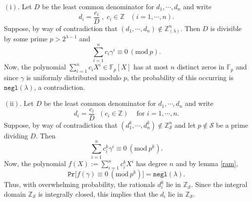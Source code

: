\documentclass[11pt, lettersize, notitlepage, leqno, footskip=0.6cm]{article}
\newcommand{\bz}{\mathbb Z}
\newcommand{\bq}{\mathbb Q}
\newcommand{\bFp}{\mathbb{F}_p}
\newcommand{\slim}{\sum\limits}
\newcommand{\ttt}{\texttt}
\newcommand{\negl}{\ttt{{negl}}}
\newcommand{\mc}{\mathcal}
\newcommand{\mbf}{\mathbf}
\newcommand{\mr}{\mathrm}
\newcommand{\lam}{\lambda}
\newcommand{\lamb}{\lambda}
\newcommand{\bzlam}{\bz_{(\lam)}}
\newcommand{\vs}{\vspace{-0.15cm}}
\newcommand{\noin}{\noindent}
\newcommand{\op}{overwhelming probability}
\newcommand{\Mod}[1]{\ (\mathrm{mod}\ #1)}
\numberwithin{equation}{section}
\begin{document}
\begin{prf} $\mr{(i)}$. Let $D$ be the least common denominator for $d_1,\cdots, d_n$ and write \vs $$d_i = \frac{c_i}{D}\;,\; c_i\in\bz\; \;\;(i=1,\cdots, n).$$ Suppose, by way of contradiction that $(d_1,\cdots, d_n )\notin \bzlam^n$. Then $D$ is divisible by some prime $p>2^{\lam-1}$ and \vs $$\sum\limits_{i=1}^n  {c_i\gamma^i} \equiv 0\Mod{p}.$$ Now, the polynomial $\sum\limits_{i=1}^n c_iX^i \in \bFp[X]$ has at most $n$ distinct zeros in $\bFp$ and since $\gamma$ is uniformly distributed modulo $p$, the probability of this occurring is $\negl(\lamb)$, a contradiction.\vspace{0.15cm} 

\noin $\mr{(ii)}$. Let $D$ be the least common denominator for $d_1,\cdots, d_n$ and write \vs $$d_i = \frac{c_i}{D}\;\; (c_i\in \bz)\;\;\; \text{ for } i=1,\cdots, n.$$ Suppose, by way of contradiction that $(d_1^{k},\cdots, d_n^{k} )\notin \bz_{\mc{S}}^n$ and let $p\notin \mc{S}$ be a prime dividing $D$. Then \vs $$\slim_{i=1}^n c_i^{k}\gamma^i \equiv 0\Mod{p^{k}}.$$ Now, the polynomial $f(X):= \slim_{i=1}^n c_i^{k} X^i$ has degree $n$ and by lemma \ref{ram}, \vs $$\ttt{Pr}\big[f(\gamma)\equiv 0\Mod{p^{k}} \big] = \negl(\lam).$$ Thus, with \op, the rationals $d_i^{k}$ lie in $\bz_{\mc{S}}$. Since the integral domain $\bz_{\mc{S}}$ is integrally closed, this implies that the $d_i$ lie in $\bz_{\mc{S}}$.\end{prf}

\begin{comment} 


\noin $\mbf{2}$. For rationals $d_1,\cdots, d_n\in \bq$ and a randomly generated $\lam$-bit integer $\gamma$, if \vs $$\slim_{i=1}^n d_i^{n\lam}\gamma^i\; \in \;\bz,$$ with \op, $(d_1,\cdots, d_n)\in \bz^n$.



\noin $\mbf{2}$. Let $D$ be the least common denominator for $d_1,\cdots, d_n$ and write $d_i = \frac{c_i}{D}$ for $i=1,\cdots, n.$ Suppose, by way of contradiction that $(d_1^{n\lam},\cdots, d_n^{n\lam} )\notin \bz^n$ and let $p$ be a prime dividing $D$. Then $$\slim_{i=1}^n c_i^{n\lam}\gamma^i \equiv 0\Mod{p^{n\lam}}.$$ Now, the polynomial $f(X):= \slim_{i=1}^n c_i^{n\lam} X^i$ has degree $n$ and by the preceding lemma, \vs $$\ttt{Pr}\big[h(\gamma)\equiv 0\Mod{p^{n\lam}} \big] = \negl(\lam).$$ Thus, with \op, the rationals $d_i^{n\lam}$ are integers, which in turn implies that the $d_i$ are integers. \end{comment}
\end{document}
